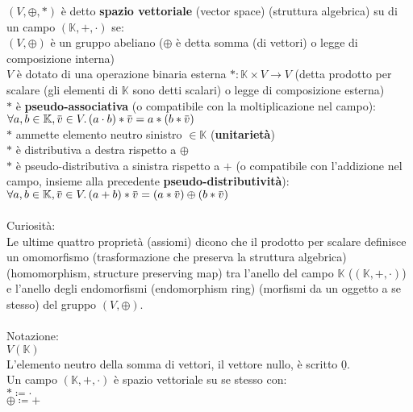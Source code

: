 \documentclass[a4paper, twoside, italian, 11pt]{book}
\newcommand{\overbar}[1] {\mkern 1.5mu\overline{\mkern-1.5mu#1\mkern-1.5mu}\mkern 1.5mu}
\newcommand{\K}{\mathbb K}
\begin{document}
$(V, \oplus, *)$ è detto \textbf{spazio vettoriale} (vector space) (struttura algebrica) su di un campo $(\K, +, \cdot)$ se: \\

\noindent
$(V, \oplus)$ è un gruppo abeliano ($\oplus$ è detta somma (di vettori) o legge di composizione interna) \\

\noindent
$V$ è dotato di una operazione binaria esterna $* : \K \times V \rightarrow V$ (detta prodotto per scalare (gli elementi di $\K$ sono detti scalari) o legge di composizione esterna) \\

\noindent
$*$ è \textbf{pseudo-associativa} (o compatibile con la moltiplicazione nel campo): \\
\indent
$\forall a, b \in \K, \overbar v \in V \ldotp (a \cdot b) * \overbar v = a * (b * \overbar v)$ \\

\noindent
$*$ ammette elemento neutro sinistro $\in \K$ (\textbf{unitarietà}) \\

\noindent
$*$ è distributiva a destra rispetto a $\oplus$ \\

\noindent
$*$ è pseudo-distributiva a sinistra rispetto a $+$ (o compatibile con l'addizione nel campo, insieme alla precedente \textbf{pseudo-distributività}): \\
\indent
$\forall a, b \in \K, \overbar v \in V \ldotp (a + b) * \overbar v = (a * \overbar v) \oplus (b * \overbar v)$ \\\\


\noindent
Curiosità: \\
Le ultime quattro proprietà (assiomi) dicono che il prodotto per scalare definisce un omomorfismo (trasformazione che preserva la struttura algebrica) (homomorphism, structure preserving map) tra l'anello del campo $\K$ ($(\K, +, \cdot)$) e l'anello degli endomorfismi (endomorphism ring) (morfismi da un oggetto a se stesso) del gruppo $(V, \oplus)$. \\\\

\noindent
Notazione: \\
\indent
$V(\K)$ \\
L'elemento neutro della somma di vettori, il vettore nullo, è scritto $\underline 0$. \\

\noindent
Un campo $(\K, +, \cdot)$ è spazio vettoriale su se stesso con: \\
\indent
$* \coloneqq \cdot$ \\
\indent
$\oplus \coloneqq +$\\
\end{document}

